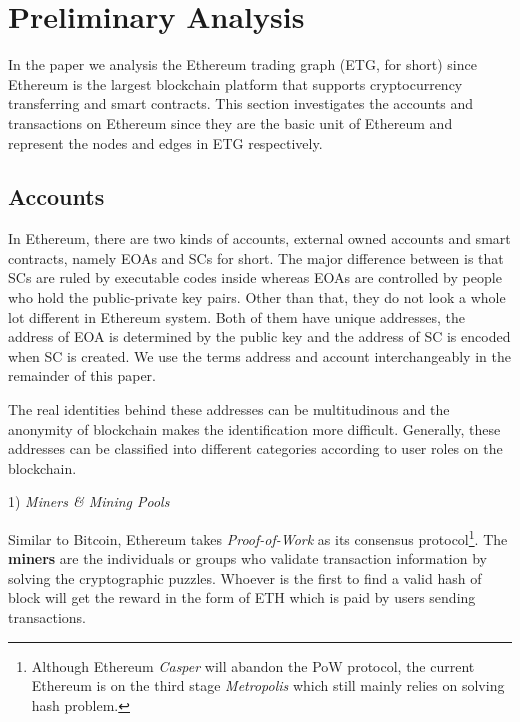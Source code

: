 
\section{Preliminary Analysis}
In the paper we analysis the Ethereum trading graph (ETG, for short) since Ethereum is the largest blockchain platform that supports cryptocurrency transferring and smart contracts. This section investigates the accounts and transactions on Ethereum since they are the basic unit of Ethereum and represent the nodes and edges in ETG respectively.


\subsection{Accounts}
In Ethereum, there are two kinds of accounts, external owned accounts and smart contracts, namely EOAs and SCs for short. The major difference between is that SCs are ruled by executable codes inside whereas EOAs are controlled by people who hold the public-private key pairs. Other than that, they do not look a whole lot different in Ethereum system. Both of them have unique addresses, the address of EOA is determined by the public key and the address of SC is encoded when SC is created. We use the terms address and account interchangeably in the remainder of this paper.

The real identities behind these addresses can be multitudinous and the anonymity of blockchain makes the identification more difficult. Generally, these addresses can be classified into different categories according to user roles on the blockchain.


1) \emph{Miners \& Mining Pools}

Similar to Bitcoin, Ethereum takes \emph{Proof-of-Work} as its consensus protocol\footnote{Although Ethereum \emph{Casper} will abandon the PoW protocol, the current Ethereum is on the third stage \emph{Metropolis} which still mainly relies on solving hash problem.}. The \textbf{miners} are the individuals or groups who validate transaction information by solving the cryptographic puzzles. Whoever is the first to find a valid hash of block will get the reward in the form of ETH which is paid by users sending transactions.

